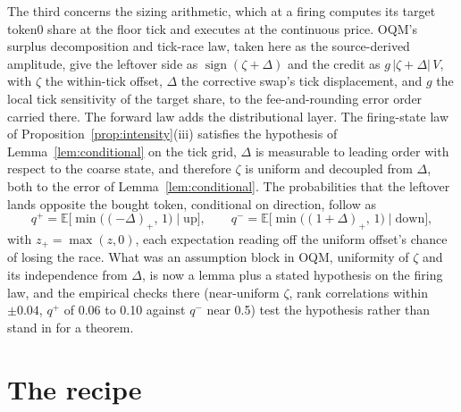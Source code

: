\documentclass[11pt,a4paper]{article}
\theoremstyle{definition}
\theoremstyle{plain}
\theoremstyle{remark}
\begin{document}
The third concerns the sizing arithmetic, which at a firing computes its target token0 share at the floor tick and executes at the continuous price. OQM's surplus 
decomposition and tick-race law, taken here as the source-derived amplitude, give the leftover side as $\operatorname{sign}(\zeta + \Delta)$ and the credit as $g\,|\zeta + \Delta|\, V$, 
with $\zeta$ the within-tick offset, $\Delta$ the corrective swap's tick displacement, and $g$ the local tick sensitivity of the target share, to the fee-and-rounding error 
order carried there. The forward law adds the distributional layer. The firing-state law of Proposition~\ref{prop:intensity}(iii) satisfies the hypothesis of Lemma~\ref{lem:conditional} 
on the tick grid, $\Delta$ is measurable to leading order with respect to the coarse state, and therefore $\zeta$ is uniform and decoupled from $\Delta$, both to the 
error of Lemma~\ref{lem:conditional}. The probabilities that the leftover lands opposite the bought token, conditional on direction, follow as
\begin{equation}\label{eq:qmix}
q^+ = \mathbb{E}\big[ \min\big((-\Delta)_+,\, 1\big) \mid \mathrm{up}
\big], \qquad
q^- = \mathbb{E}\big[ \min\big((1 + \Delta)_+,\, 1\big) \mid
\mathrm{down} \big],
\end{equation}
with $z_+ = \max(z, 0)$, each expectation reading off the uniform offset's chance of losing the race. What was an assumption block in OQM, uniformity of $\zeta$ and its 
independence from $\Delta$, is now a lemma plus a stated hypothesis on the firing law, and the empirical checks there (near-uniform $\zeta$, rank correlations 
within $\pm 0.04$, $q^+$ of 0.06 to 0.10 against $q^-$ near 0.5) test the hypothesis rather than stand in for a theorem.

\section{The recipe}\label{sec:recipe}
\end{document}

